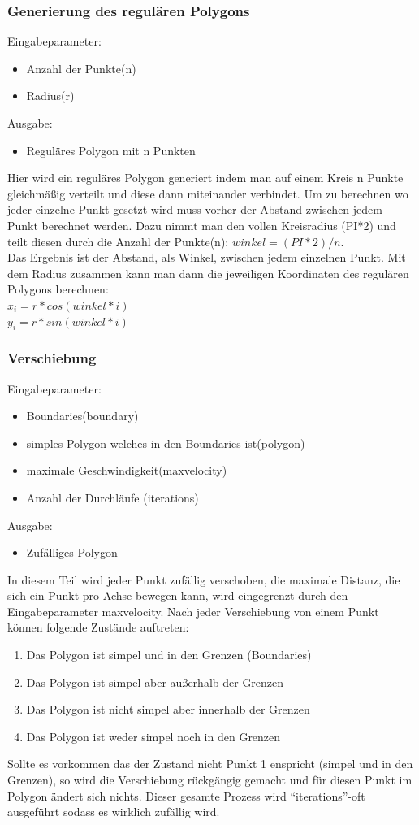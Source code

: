 \subsubsection{Generierung des regulären Polygons}
Eingabeparameter: 
\begin{itemize}
	\item Anzahl der Punkte(n)
	\item Radius(r)
\end{itemize}
Ausgabe:
\begin{itemize} 
	\item Reguläres Polygon mit n Punkten
\end{itemize}
Hier wird ein reguläres Polygon generiert indem man auf einem Kreis n Punkte gleichmäßig verteilt und diese dann miteinander verbindet. Um zu berechnen wo jeder einzelne Punkt gesetzt wird muss vorher der Abstand zwischen jedem Punkt berechnet werden. Dazu nimmt man den vollen Kreisradius (PI*2) und teilt diesen durch die Anzahl der Punkte(n): $winkel = (PI * 2) / n$.\\ 
Das Ergebnis ist der Abstand, als Winkel, zwischen jedem einzelnen Punkt.
Mit dem Radius zusammen kann man dann die jeweiligen Koordinaten des regulären Polygons berechnen:\\
$x_i = r * cos(winkel * i)$\\
$y_i = r * sin(winkel * i)$

\subsubsection{Verschiebung}
Eingabeparameter: 
\begin{itemize}
	\item Boundaries(boundary)
	\item simples Polygon welches in den Boundaries ist(polygon)
	\item maximale Geschwindigkeit(maxvelocity)
	\item Anzahl der Durchläufe (iterations)
\end{itemize}
Ausgabe:
\begin{itemize}
	\item Zufälliges Polygon
\end{itemize}
In diesem Teil wird jeder Punkt zufällig verschoben, die maximale Distanz, die sich ein Punkt pro Achse bewegen kann, wird eingegrenzt durch den Eingabeparameter maxvelocity. Nach jeder Verschiebung von einem Punkt können folgende Zustände auftreten:
\begin{enumerate}
	\item Das Polygon ist simpel und in den Grenzen (Boundaries)
	\item Das Polygon ist simpel aber außerhalb der Grenzen
	\item Das Polygon ist nicht simpel aber innerhalb der Grenzen
	\item Das Polygon ist weder simpel noch in den Grenzen
\end{enumerate}
Sollte es vorkommen das der Zustand nicht Punkt 1 enspricht (simpel und in den Grenzen), so wird die Verschiebung rückgängig gemacht und für diesen Punkt im Polygon ändert sich nichts.
Dieser gesamte Prozess wird \enquote{iterations}-oft ausgeführt sodass es wirklich zufällig wird.

